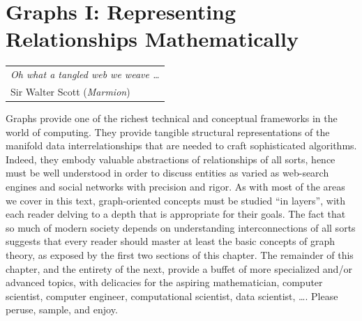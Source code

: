 
\chapter{Graphs I:
Representing Relationships Mathematically}
\label{ch:Graphs1}

\hfill
\begin{tabular}{l}
{\em Oh what a tangled web we weave \ldots} \\
\hfill {\small Sir Walter Scott ({\it Marmion})}
\end{tabular}

\vspace*{.5in}

\noindent
Graphs provide one of the richest technical and conceptual frameworks in the world of computing.  They provide tangible structural representations of the manifold data interrelationships that are needed to craft sophisticated algorithms.  Indeed, they embody valuable abstractions of relationships of all sorts, hence must be well understood in order to discuss entities as varied as web-search engines and social networks with precision and rigor.  As with most of the areas we cover in this text, graph-oriented concepts must be studied ``in layers'', with each reader delving to a depth that is appropriate for their goals.   The fact that so much of modern society depends on understanding interconnections of all sorts suggests that every reader should master at least the basic concepts of graph theory, as exposed by the first two sections of this chapter.  The remainder of this chapter, and the entirety of the next, provide a buffet of more specialized and/or advanced topics, with delicacies for the aspiring mathematician, computer scientist,  computer engineer, computational scientist, data scientist, \ldots.  Please peruse, sample, and enjoy.

\smallskip


